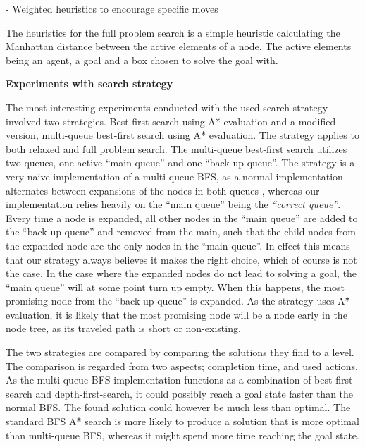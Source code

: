 \documentclass[Main]{subfiles}
\begin{document}
- Weighted heuristics to encourage specific moves

The heuristics for the full problem search is a simple heuristic calculating the Manhattan distance between the active elements of a node. The active elements being an agent, a goal and a box chosen to solve the goal with. 




\textbf{Experiments with search strategy}



The most interesting experiments conducted with the used search strategy involved two strategies. Best-first search using A* evaluation and a modified version, multi-queue best-first search using A\^{*} evaluation. The strategy applies to both relaxed and full problem search. 
The multi-queue best-first search utilizes two queues, one active ``main queue'' and one ``back-up queue''. The strategy is a very naive implementation of a multi-queue BFS, as a normal implementation alternates between expansions of the nodes in both queues \citep{hector2013a}, whereas our implementation relies heavily on the ``main queue'' being the \textit{``correct queue''}. Every time a node is expanded, all other nodes in the ``main queue'' are added to the ``back-up queue'' and removed from the main, such that the child nodes from the expanded node are the only nodes in the ``main queue''. In effect this means that our strategy always believes it makes the right choice, which of course is not the case. In the case where the expanded nodes do not lead to solving a goal, the ``main queue'' will at some point turn up empty. When this happens, the most promising node from the ``back-up queue'' is expanded. As the strategy uses A\^{*} evaluation, it is likely that the most promising node will be a node early in the node tree, as its traveled path is short or non-existing. 

The two strategies are compared by comparing the solutions they find to a level. The comparison is regarded from two aspects; completion time, and used actions. As the multi-queue BFS implementation functions as a combination of best-first-search and depth-first-search, it could possibly reach a goal state faster than the normal BFS. The found solution could however be much less than optimal. The standard BFS A\^{*} search is more likely to produce a solution that is more optimal than multi-queue BFS, whereas it might spend more time reaching the goal state. 
\end{document}
